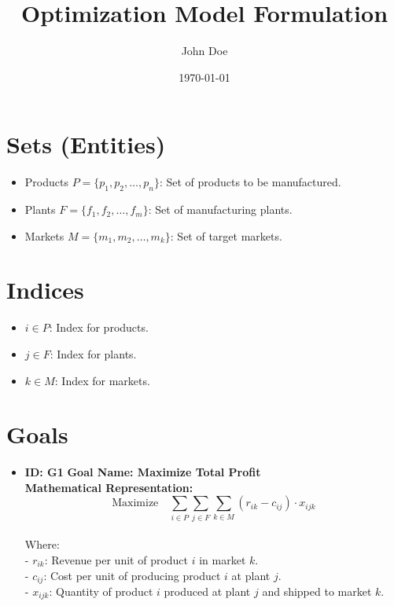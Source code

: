 \documentclass{article}
\title{Optimization Model Formulation}
\author{John Doe}
\date{\today}
\begin{document}
\maketitle
\tableofcontents
\newpage

\section{Sets (Entities)}
\begin{itemize}
    \item Products $P = \{p_1, p_2, \dots, p_n\}$: Set of products to be manufactured.
    \item Plants $F = \{f_1, f_2, \dots, f_m\}$: Set of manufacturing plants.
    \item Markets $M = \{m_1, m_2, \dots, m_k\}$: Set of target markets.
\end{itemize}

\section{Indices}
\begin{itemize}
    \item $i \in P$: Index for products.
    \item $j \in F$: Index for plants.
    \item $k \in M$: Index for markets.
\end{itemize}

\section{Goals}
\begin{itemize}
    \item \textbf{ID: G1} \textbf{Goal Name: Maximize Total Profit} \\
    \textbf{Mathematical Representation:} \\
    $$
    \text{Maximize} \quad \sum_{i \in P} \sum_{j \in F} \sum_{k \in M} (r_{ik} - c_{ij}) \cdot x_{ijk}
    $$ \\
    Where: \\
    - $r_{ik}$: Revenue per unit of product $i$ in market $k$. \\
    - $c_{ij}$: Cost per unit of producing product $i$ at plant $j$. \\
    - $x_{ijk}$: Quantity of product $i$ produced at plant $j$ and shipped to market $k$.
\end{itemize}
\end{document}
